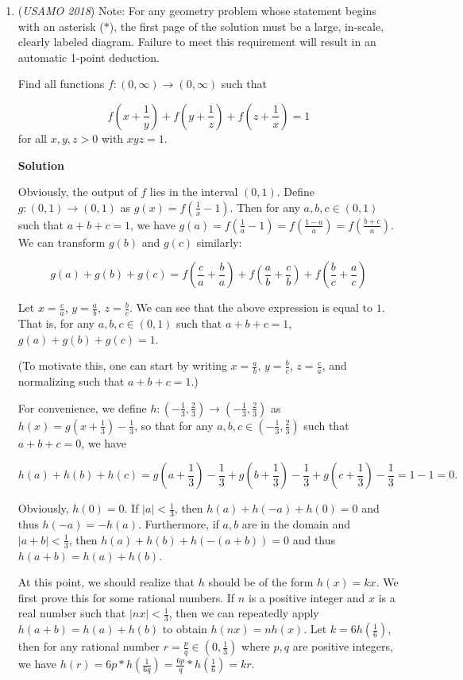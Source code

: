 \begin{enumerate}
 -Themathcanadian

 


	\item (\textit{USAMO 2018}) Note: For any geometry problem whose statement begins with an asterisk ($*$), the first page of the solution must be a large, in-scale, clearly labeled diagram. Failure to meet this requirement will result in an automatic 1-point deduction.


 Find all functions $f:(0,\infty) \rightarrow (0,\infty)$ such that


 
 \[f\left(x+\frac{1}{y}\right)+f\left(y+\frac{1}{z}\right) + f\left(z+\frac{1}{x}\right) = 1\]
for all $x,y,z >0$ with $xyz =1.$




\textbf{Solution}

Obviously, the output of $f$ lies in the interval $(0,1)$. Define $g:(0,1)\to(0,1)$ as $g(x)=f\left(\frac1x-1\right)$. Then for any $a,b,c\in(0,1)$ such that $a+b+c=1$, we have $g(a)=f\left(\frac1a-1\right)=f\left(\frac{1-a}a\right)=f\left(\frac{b+c}a\right)$. We can transform $g(b)$ and $g(c)$ similarly:

 
 \[g(a)+g(b)+g(c)=f\left(\frac ca+\frac ba\right)+f\left(\frac ab+\frac cb\right)+f\left(\frac bc+\frac ac\right)\]

 Let $x=\frac ca$, $y=\frac ab$, $z=\frac bc$. We can see that the above expression is equal to $1$. That is, for any $a,b,c\in(0,1)$ such that $a+b+c=1$, $g(a)+g(b)+g(c)=1$.

 (To motivate this, one can start by writing $x=\frac ab$, $y=\frac bc$, $z=\frac ca$, and normalizing such that $a+b+c=1$.)

 
For convenience, we define $h:\left(-\frac13,\frac23\right)\to\left(-\frac13,\frac23\right)$ as $h(x)=g\left(x+\frac13\right)-\frac13$, so that for any $a,b,c\in\left(-\frac13,\frac23\right)$ such that $a+b+c=0$, we have 

 
 \[h(a)+h(b)+h(c)=g\left(a+\frac13\right)-\frac13+g\left(b+\frac13\right)-\frac13+g\left(c+\frac13\right)-\frac13=1-1=0.\]

 Obviously, $h(0)=0$. If $|a|<\frac13$, then $h(a)+h(-a)+h(0)=0$ and thus $h(-a)=-h(a)$. Furthermore, if $a,b$ are in the domain and $|a+b|<\frac13$, then $h(a)+h(b)+h(-(a+b))=0$ and thus $h(a+b)=h(a)+h(b)$. 

 
At this point, we should realize that $h$ should be of the form $h(x)=kx$. We first prove this for some rational numbers. If $n$ is a positive integer and $x$ is a real number such that $|nx|<\frac13$, then we can repeatedly apply $h(a+b)=h(a)+h(b)$ to obtain $h(nx)=nh(x)$. Let $k=6h\left(\frac16\right)$, then for any rational number $r=\frac pq\in\left(0,\frac13\right)$ where $p,q$ are positive integers, we have $h(r)=6p*h\left(\frac1{6q}\right)=\frac{6p}q*h\left(\frac16\right)=kr$.


\end{enumerate}
